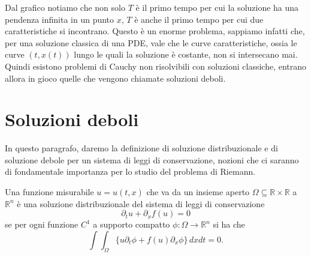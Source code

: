 Dal grafico notiamo che non solo $T$ è il primo tempo per cui la soluzione ha una pendenza infinita in un punto $x$, $T$ è anche il primo tempo per cui due caratteristiche si incontrano. Questo è un enorme problema, sappiamo infatti che, per una soluzione classica di una PDE, vale che le curve caratteristiche, ossia le curve $(t,x(t))$ lungo le quali la soluzione è costante, non si intersecano mai. Quindi esistono problemi di Cauchy non risolvibili con soluzioni classiche, entrano allora in gioco quelle che vengono chiamate soluzioni deboli.

\section{Soluzioni deboli}

In questo paragrafo, daremo la definizione di soluzione distribuzionale e di soluzione debole per un sistema di leggi di conservazione, nozioni che ci saranno di fondamentale importanza per lo studio del problema di Riemann.

\begin{definizione}
    Una funzione misurabile $u=u(t,x)$ che va da un insieme aperto $\Omega\subseteq\mathbb{R}\times\mathbb{R}$ a $\mathbb{R}^{n}$ è una soluzione distribuzionale del sistema di leggi di conservazione 
    \begin{equation}\label{eq:2.15}
        \partial_{t}u+\partial_{x}f(u)=0
    \end{equation}
    se per ogni funzione $C^{1}$ a supporto compatto $\phi\colon\Omega\longrightarrow\mathbb{R}^{n}$ si ha che 
    \begin{equation}\label{eq:2.16}
        \int\int_{\Omega}\{u\partial_{t}\phi+f(u)\partial_{x}\phi\}\,dxdt = 0.
    \end{equation}
\end{definizione}

